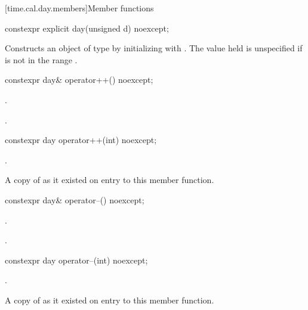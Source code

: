 [time.cal.day.members]{Member functions}

%
\begin{itemdecl}
constexpr explicit day(unsigned d) noexcept;
\end{itemdecl}

\begin{itemdescr}
\pnum
\effects
Constructs an object of type  by
initializing  with .
The value held is unspecified if  is not in the range .
\end{itemdescr}

%
\begin{itemdecl}
constexpr day& operator++() noexcept;
\end{itemdecl}

\begin{itemdescr}
\pnum
\effects
{}.

\pnum
\returns
{}.
\end{itemdescr}

%
\begin{itemdecl}
constexpr day operator++(int) noexcept;
\end{itemdecl}

\begin{itemdescr}
\pnum
\effects
{}.

\pnum
\returns
A copy of  as it existed on entry to this member function.
\end{itemdescr}

%
\begin{itemdecl}
constexpr day& operator--() noexcept;
\end{itemdecl}

\begin{itemdescr}
\pnum
\effects
{}.

\pnum
\returns
{}.
\end{itemdescr}

%
\begin{itemdecl}
constexpr day operator--(int) noexcept;
\end{itemdecl}

\begin{itemdescr}
\pnum
\effects
{}.

\pnum
\returns
A copy of  as it existed on entry to this member function.
\end{itemdescr}

